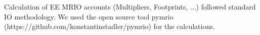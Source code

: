 Calculation of EE MRIO accounts (Multipliers, Footprints, ...) followed
standard IO methodology. We used the open source tool pymrio (https://github.com/konstantinstadler/pymrio) for the calculations.
